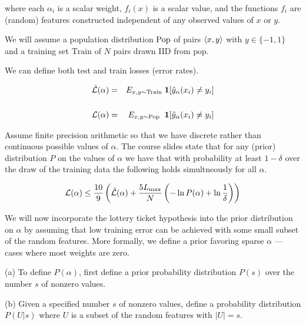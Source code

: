 \documentclass{article}
\newcommand{\solution}[1]{}
\begin{document}
    where each $\alpha_i$ is a scalar weight, $f_i(x)$ is a scalar value, and the functions $f_i$ are (random) features constructed independent of any observed values of $x$ or $y$.

    We will assume a population distribution $\mathrm{Pop}$ of pairs ${\mbox{$\langle x,y\rangle$}}$ with $y \in \{-1,1\}$ and a training set $\mathrm{Train}$ of $N$ pairs drawn IID from $\mathrm{pop}$.

    We can define both test and train losses (error rates).

    \begin{eqnarray*}
      \hat{\cal L}(\alpha) & = & E_{{x,y} \sim \mathrm{Train}}\;\mathbf{1}[\hat{y}_\alpha(x_i) \neq y_i] \\
      \\
      {\cal L}(\alpha) & = & E_{{x,y} \sim \mathrm{Pop}}\;\;\mathbf{1}[\hat{y}_\alpha(x_i) \not = y_i] \\
    \end{eqnarray*}

    Assume finite precision arithmetic so that we have discrete rather than continuous possible values of $\alpha$.
    The course slides state that for any (prior) distribution $P$ on the values of $\alpha$ we have that with probability at least $1-\delta$
    over the draw of the training data the following holds simultneously for all $\alpha$.

    $${\cal L}(\alpha) \leq \frac{10}{9}\left(\hat{\cal L}(\alpha) + \frac{5L_\mathrm{max}}{N}\left(-\ln P(\alpha) + \ln \frac{1}{\delta}\right)\right)$$

    We will now incorporate the lottery ticket hypothesis into the prior distribution on $\alpha$ by assuming that low training error can be achieved with some small subset of the random features.
    More formally, we define a prior favoring sparse $\alpha$ --- cases where most weights are zero.
    
    \medskip
    (a) To define $P(\alpha)$, first define a prior probability distribution $P(s)$ over the number $s$ of nonzero values.

    \solution{
      There are of course many solutions.  A uniform distribution on the numbers from $1$ to $d$ will work giving $P(s) = 1/d$.  Another
      possibility is $P(s) = \epsilon(1-\epsilon)^s$ which defines a distribution on all $s \geq 0$.}
    
    \medskip
    (b) Given a specified number $s$ of nonzero values, define a probability distribution $P(U|s)$ where $U$ is a subset of the random features with $|U| = s$.
\end{document}
